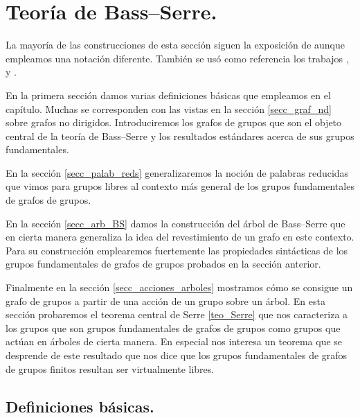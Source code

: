 \documentclass[tesis.tex]{subfiles}
\begin{document}
\chapter{Teoría de Bass--Serre.}\label{cap_BS}

La mayoría de las construcciones de esta sección siguen la exposición de \cite{serre2002trees} aunque empleamos una notación diferente. 
También se usó como referencia los trabajos \cite{scott1979topological}, \cite{diekert2017context} y \cite{dicks1989groups}.

En la primera sección damos varias definiciones básicas que empleamos en el capítulo. 
Muchas se corresponden con las vistas en la sección \ref{secc_graf_nd} sobre grafos no dirigidos.
Introduciremos los grafos de grupos que son el objeto central de la teoría de Bass--Serre y los resultados estándares acerca de sus grupos fundamentales.

En la sección \ref{secc_palab_reds} generalizaremos la noción de palabras reducidas que vimos para grupos libres al contexto más general de los grupos fundamentales de grafos de grupos.

En la sección \ref{secc_arb_BS} damos la construcción del árbol de Bass--Serre que en cierta manera generaliza la idea del revestimiento de un grafo en este contexto.
Para su construcción emplearemos fuertemente las propiedades sintácticas de los grupos fundamentales de grafos de grupos probados en la sección anterior.

Finalmente en la sección \ref{secc_acciones_arboles} mostramos cómo se consigue un grafo de grupos a partir de una acción de un grupo sobre un árbol.
En esta sección probaremos el teorema central de Serre \ref{teo_Serre} que nos caracteriza a los grupos que son grupos fundamentales de grafos de grupos como grupos que actúan en árboles de cierta manera.
En especial nos interesa un teorema que se desprende de este resultado que nos dice que los grupos fundamentales de grafos de grupos finitos resultan ser virtualmente libres. 



\section{Definiciones básicas.}\label{secc_defs_basicas}
\end{document}
